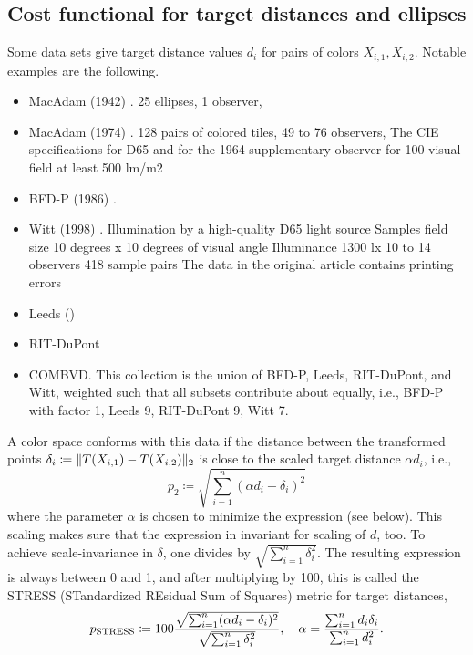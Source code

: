 \documentclass{scrartcl}
\theoremstyle{named}
\DeclarePairedDelimiter{\norm}{\lVert}{\rVert}
\begin{document}
\subsection{Cost functional for target distances and ellipses}

Some data sets give target distance values $d_i$ for pairs of colors $X_{i,1}, X_{i,2}$.
Notable examples are the following.
\begin{itemize}
  \item MacAdam (1942) \cite{macadam1942}.
     25 ellipses,
     1 observer,
  \item MacAdam (1974) \cite{macadam1974}.
     128 pairs of colored tiles,
     49 to 76 observers,
     The CIE specifications for D65 and for the 1964
     supplementary observer for 100 visual field
     at least 500 lm/m2
   \item BFD-P (1986) \cite{luorigg}.

   \item Witt (1998) \cite{witt}.
     Illumination by a high-quality D65 light source
     Samples field size 10 degrees x 10 degrees of visual angle
     Illuminance 1300 lx
     10 to 14 observers
     418 sample pairs
     The data in the original article contains printing errors

  \item Leeds ()

  \item RIT-DuPont

  \item COMBVD.
    This collection is the union of BFD-P, Leeds, RIT-DuPont, and Witt, weighted such
    that all subsets contribute about equally, i.e., BFD-P with factor 1, Leeds 9,
    RIT-DuPont 9, Witt 7.
\end{itemize}

A color space conforms with this data if the distance between the transformed points
$\delta_i \coloneqq \norm{T(X_{i,1}) - T(X_{i,2})}_2$
is close to the scaled target distance $\alpha d_i$, i.e.,
\begin{equation}\label{eq:p}
  p_2
  \coloneqq \sqrt{\sum_{i=1}^n (\alpha d_i - \delta_i)^2}
\end{equation}
where the parameter $\alpha$ is chosen to minimize the expression (see below).
This scaling makes sure that the expression in invariant for scaling of $d$, too. To
achieve scale-invariance in $\delta$, one divides by $\sqrt{\sum_{i=1}^n \delta_i^2}$.
The resulting expression is always between 0 and 1, and after multiplying by 100, this
is called the STRESS (STandardized REsidual Sum of Squares) metric for target distances,
\begin{equation}\label{eq:p}
  p_{\text{STRESS}}
  \coloneqq
  100
  \frac{%
    \sqrt{\sum_{i=1}^n (\alpha d_i - \delta_i)^2}
  }{
    \sqrt{\sum_{i=1}^n \delta_i^2}
  },\quad
  \alpha = \frac{\sum_{i=1}^n d_i \delta_i}{\sum_{i=1}^n d_i^2}.
\end{equation}
\end{document}
